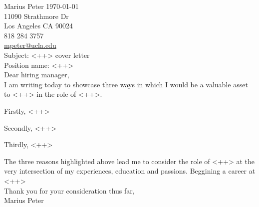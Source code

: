 \documentclass[12pt]{article}
\begin{document}
\noindent Marius Peter \hfill \today\\
11090 Strathmore Dr\\
Los Angeles CA 90024\\
818 284 3757\\
\href{mailto:mpeter@ucla.edu}{mpeter@ucla.edu}\\[0.8cm]

\noindent Subject: <++> cover letter\\
Position name: <++>\\
\vfill
Dear hiring manager,\\[0.4cm]

I am writing today to showcase three ways in which I would be a valuable asset to <++> in the role of <++>.

Firstly, <++>

Secondly, <++>

Thirdly, <++>

The three reasons highlighted above lead me to consider the role of <++> at the very intersection of my experiences, education and passions. Beggining a career at <++> \\[0.8cm]

Thank you for your consideration thus far,\\[0.4cm]

Marius Peter
\end{document}
